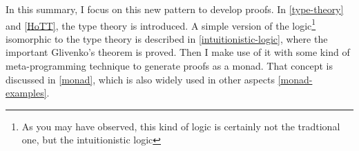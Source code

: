 In this summary, I focus on this new pattern to develop proofs.
In \autoref{type-theory} and \autoref{HoTT}, the type theory is
introduced. A simple version of the logic\footnote{As you may have 
observed, this kind of logic is certainly not the tradtional one, but the 
intuitionistic logic} isomorphic to the type theory is described in 
\autoref{intuitionistic-logic}, where the important Glivenko's theorem 
is proved. Then I make use of it with some kind of meta-programming
technique to generate proofs as a monad. That concept is discussed
in \autoref{monad}, which is also widely used in other aspects
\autoref{monad-examples}.
